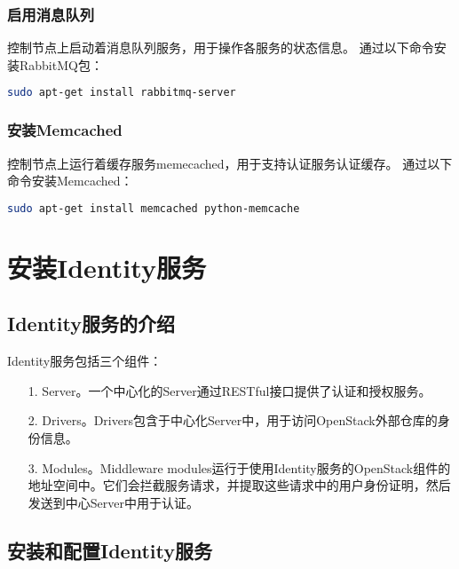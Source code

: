 \documentclass[a4paper,left=2.5cm,right=2.5cm,11pt]{article}
\begin{document}
\subsubsection{启用消息队列}
	控制节点上启动着消息队列服务，用于操作各服务的状态信息。
	通过以下命令安装RabbitMQ包：
	\begin{lstlisting}[language = bash]
	sudo apt-get install rabbitmq-server
	\end{lstlisting}

\subsubsection{安装Memcached}
	控制节点上运行着缓存服务memecached，用于支持认证服务认证缓存。
	通过以下命令安装Memcached：
	\begin{lstlisting}[language = bash]
	sudo apt-get install memcached python-memcache
	\end{lstlisting}

\section{安装Identity服务}
\subsection{Identity服务的介绍}
	Identity服务包括三个组件：
	\begin{itemize}
		\item[1.] Server。一个中心化的Server通过RESTful接口提供了认证和授权服务。
		\item[2.] Drivers。Drivers包含于中心化Server中，用于访问OpenStack外部仓库的身份信息。
		\item[3.] Modules。Middleware modules运行于使用Identity服务的OpenStack组件的地址空间中。它们会拦截服务请求，并提取这些请求中的用户身份证明，然后发送到中心Server中用于认证。
	\end{itemize}

\subsection{安装和配置Identity服务}
\end{document}
